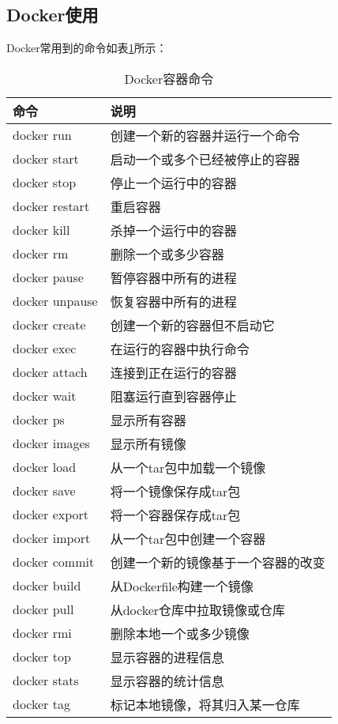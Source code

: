 \documentclass[lang=cn,a4paper,newtx]{elegantpaper}
\begin{document}
\subsection{Docker使用}
Docker常用到的命令如表\ref{tab:docker_command}所示：
\begin{table}[hbpt]
  \centering
  \caption{Docker容器命令}
  \label{tab:docker_command}
  \begin{tabular}{p{}<{\centering}p{}<{\centering}}
    \toprule[1.5pt]
    \textbf{命令} & \textbf{说明} \\
    \midrule[1pt]
    docker run & 创建一个新的容器并运行一个命令 \\
    docker start & 启动一个或多个已经被停止的容器 \\
    docker stop & 停止一个运行中的容器 \\
    docker restart & 重启容器 \\
    docker kill & 杀掉一个运行中的容器 \\
    docker rm & 删除一个或多少容器 \\
    docker pause & 暂停容器中所有的进程 \\
    docker unpause & 恢复容器中所有的进程 \\
    docker create & 创建一个新的容器但不启动它 \\
    docker exec & 在运行的容器中执行命令 \\
    docker attach & 连接到正在运行的容器 \\
    docker wait & 阻塞运行直到容器停止 \\
    docker ps & 显示所有容器 \\
    docker images & 显示所有镜像 \\
    docker load & 从一个tar包中加载一个镜像 \\
    docker save & 将一个镜像保存成tar包 \\
    docker export & 将一个容器保存成tar包 \\
    docker import & 从一个tar包中创建一个容器 \\
    docker commit & 创建一个新的镜像基于一个容器的改变 \\
    docker build & 从Dockerfile构建一个镜像 \\
    docker pull & 从docker仓库中拉取镜像或仓库 \\
    docker rmi & 删除本地一个或多少镜像 \\
    docker top & 显示容器的进程信息 \\
    docker stats & 显示容器的统计信息 \\
    docker tag & 标记本地镜像，将其归入某一仓库 \\
    \bottomrule[1.5pt]
  \end{tabular}
\end{table}
\end{document}
